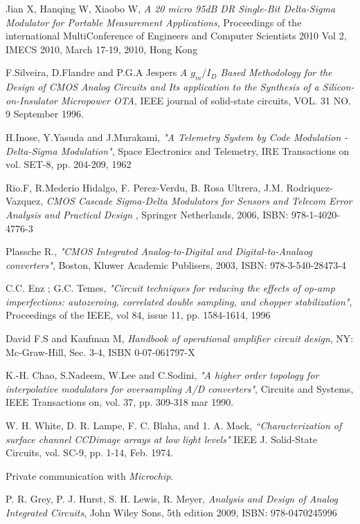 \begin{thebibliography}{9}
Jian X, Hanqing W, Xiaobo W,
\textit{A 20 micro 95dB DR Single-Bit Delta-Sigma Modulator for Portable Measurement Applications},
Proceedings of the international MultiConference of Engineers and Computer Scientists 2010 Vol 2,
IMECS 2010, March 17-19, 2010, Hong Kong

F.Silveira, D.Flandre and P.G.A Jespers
\textit{A $g_m/I_D$ Based Methodology for the Design of CMOS Analog Circuits and Its application to the Synthesis of a Silicon-on-Insulator Micropower OTA},
IEEE journal of solid-state circuits, VOL. 31 NO. 9 September 1996.


H.Inose, Y.Yasuda and J.Murakami,
\textit{"A Telemetry System by Code Modulation - Delta-Sigma Modulation"},
Space Electronics and Telemetry,
IRE Transactions on vol.
SET-8, pp. 204-209,
1962

Rio.F, R.Mederio Hidalgo, F. Perez-Verdu, B. Rosa Ultrera, J.M. Rodriquez-Vazquez,
\textit{CMOS Cascade Sigma-Delta Modulators for Sensors and Telecom Error Analysis and Practical Design },
Springer Netherlands, 2006,
ISBN: 978-1-4020-4776-3

Plassche R., 
\textit{"CMOS Integrated Analog-to-Digital and Digital-to-Analaog converters"},
Boston, Kluwer Academic Publisers, 2003,
ISBN: 978-3-540-28473-4

 C.C. Enz ; G.C. Temes,
 \textit{"Circuit techniques for reducing the effects of op-amp imperfections: autozeroing, correlated double sampling, and chopper stabilization"},
 Proceedings of the IEEE,
 vol 84, issue 11,
 pp. 1584-1614,
 1996

David F.S and Kaufman M, 
\textit{Handbook of operational amplifier circuit design},
NY: Mc-Graw-Hill,
Sec. 3-4, 
ISBN 0-07-061797-X

K.-H. Chao, S.Nadeem, W.Lee and C.Sodini, 
\textit{"A higher order topology for interpolative modulators for oversampling A/D converters"},
Circuits and Systems, IEEE Transactions on, vol. 37, pp. 309-318 mar 1990.

W. H. White, D. R. Lampe, F. C. Blaha, and 1. A. Mack, \textit{“Characterization
of surface channel CCDimage arrays at low light levels"}
IEEE J. Solid-State Circuits, vol. SC-9, pp. 1-14, Feb. 1974.

Private communication with \textit{Microchip}.

P. R. Grey, P. J. Hurst, S. H. Lewis, R. Meyer,
\textit{Analysis and Design of Analog Integrated Circuits},
John Wiley Sons, 5th edition 2009,
ISBN: 978-0470245996



\end{thebibliography}
